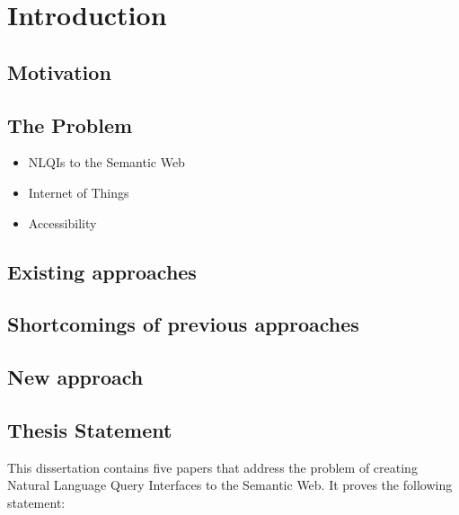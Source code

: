 \documentclass[../main.tex]{subfiles}
\begin{document}
\chapter{Introduction}
\begin{refsection}

\label{chapter:intro}


\section{Motivation}


\section {The Problem}

\begin{itemize}
    \item NLQIs to the Semantic Web
    \item Internet of Things
    \item Accessibility
\end{itemize}


\section {Existing approaches}



\section {Shortcomings of previous approaches}


\section {New approach}


\section{Thesis Statement}

This dissertation contains five papers that address the problem of creating Natural Language Query Interfaces to the Semantic Web.  It proves the following statement:


\end{refsection}
\end{document}
